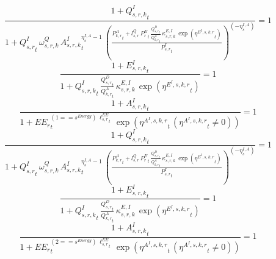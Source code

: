 \noindent[name= `regional sector demand for intermediates from aggregate sector 3 1 1']
\begin{dmath}
\frac{1+{{Q^{I}_{s,r,k}}}_{t}}{1+{{Q^{I}_{s,r}}}_{t}\, {{\omega^{Q}_{s,r,k}}}\, {{A^{I}_{s,r,k}}}_{t}^{{{\eta^{I,A}_{s}}}-1}\, \left(\frac{{{P^{A}_{k,r}}}_{t}+{{l^{Q}_{s,r}}}\, {{P^E_r}}_{t}\, \frac{{{Q^{D}_{s,r}}}_{t}}{{{Q^{A}_{k,r}}}_{t}}\, {{\kappa^{E,I}_{s,r,k}}}\, \exp\left({{\eta^{E^{I},s,k,r}}}_{t}\right)}{{{P^{I}_{s,r}}}_{t}}\right)^{\left(-{{\eta^{I,A}_{s}}}\right)}}=1
\end{dmath}
\noindent[name= `regional emissions caused by using intermediates from aggregate sector 3 1 1']
\begin{dmath}
\frac{1+{{E^I_{s,r,k}}}_{t}}{1+{{Q^{I}_{s,r,k}}}_{t}\, \frac{{{Q^{D}_{s,r}}}_{t}}{{{Q^{A}_{k,r}}}_{t}}\, {{\kappa^{E,I}_{s,r,k}}}\, \exp\left({{\eta^{E^{I},s,k,r}}}_{t}\right)}=1
\end{dmath}
\noindent[name= `productivity of intermediates in subsector 3 region 1 from sector 1']
\begin{dmath}
\frac{1+{{A^{I}_{s,r,k}}}_{t}}{1+{{EE_r}}_{t}^{\left(1=={{s^{Energy}}}\right)\, {{\ell^{EE}_{s,r}}}_{t}}\, \exp\left({{\eta^{A^{I},s,k,r}}}_{t}\, \left({{\eta^{A^{I},s,k,r}}}_{t}\neq 0\right)\right)}=1
\end{dmath}
\noindent[name= `regional sector demand for intermediates from aggregate sector 3 1 2']
\begin{dmath}
\frac{1+{{Q^{I}_{s,r,k}}}_{t}}{1+{{Q^{I}_{s,r}}}_{t}\, {{\omega^{Q}_{s,r,k}}}\, {{A^{I}_{s,r,k}}}_{t}^{{{\eta^{I,A}_{s}}}-1}\, \left(\frac{{{P^{A}_{k,r}}}_{t}+{{l^{Q}_{s,r}}}\, {{P^E_r}}_{t}\, \frac{{{Q^{D}_{s,r}}}_{t}}{{{Q^{A}_{k,r}}}_{t}}\, {{\kappa^{E,I}_{s,r,k}}}\, \exp\left({{\eta^{E^{I},s,k,r}}}_{t}\right)}{{{P^{I}_{s,r}}}_{t}}\right)^{\left(-{{\eta^{I,A}_{s}}}\right)}}=1
\end{dmath}
\noindent[name= `regional emissions caused by using intermediates from aggregate sector 3 1 2']
\begin{dmath}
\frac{1+{{E^I_{s,r,k}}}_{t}}{1+{{Q^{I}_{s,r,k}}}_{t}\, \frac{{{Q^{D}_{s,r}}}_{t}}{{{Q^{A}_{k,r}}}_{t}}\, {{\kappa^{E,I}_{s,r,k}}}\, \exp\left({{\eta^{E^{I},s,k,r}}}_{t}\right)}=1
\end{dmath}
\noindent[name= `productivity of intermediates in subsector 3 region 1 from sector 2']
\begin{dmath}
\frac{1+{{A^{I}_{s,r,k}}}_{t}}{1+{{EE_r}}_{t}^{\left(2=={{s^{Energy}}}\right)\, {{\ell^{EE}_{s,r}}}_{t}}\, \exp\left({{\eta^{A^{I},s,k,r}}}_{t}\, \left({{\eta^{A^{I},s,k,r}}}_{t}\neq 0\right)\right)}=1
\end{dmath}
